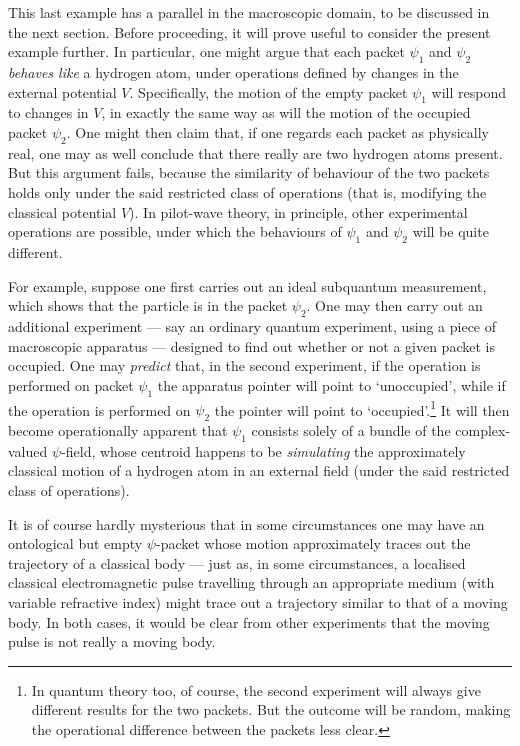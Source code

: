 \documentclass[12pt]{article}%
\begin{document}
This last example has a parallel in the macroscopic domain, to be discussed in
the next section. Before proceeding, it will prove useful to consider the
present example further. In particular, one might argue that each packet
$\psi_{1}$ and $\psi_{2}$ \textit{behaves like} a hydrogen atom, under
operations defined by changes in the external potential $V$. Specifically, the
motion of the empty packet $\psi_{1}$ will respond to changes in $V$, in
exactly the same way as will the motion of the occupied packet $\psi_{2}$. One
might then claim that, if one regards each packet as physically real, one may
as well conclude that there really are two hydrogen atoms present. But this
argument fails, because the similarity of behaviour of the two packets holds
only under the said restricted class of operations (that is, modifying the
classical potential $V$). In pilot-wave theory, in principle, other
experimental operations are possible, under which the behaviours of $\psi_{1}$
and $\psi_{2}$ will be quite different.

For example, suppose one first carries out an ideal subquantum measurement,
which shows that the particle is in the packet $\psi_{2}$. One may then carry
out an additional experiment --- say an ordinary quantum experiment, using a
piece of macroscopic apparatus --- designed to find out whether or not a given
packet is occupied. One may \textit{predict} that, in the second experiment,
if the operation is performed on packet $\psi_{1}$ the apparatus pointer will
point to `unoccupied', while if the operation is performed on $\psi_{2}$ the
pointer will point to `occupied'.\footnote{In quantum theory too, of course,
the second experiment will always give different results for the two packets.
But the outcome will be random, making the operational difference between the
packets less clear.} It will then become operationally apparent that $\psi
_{1}$ consists solely of a bundle of the complex-valued $\psi$-field, whose
centroid happens to be \textit{simulating} the approximately classical motion
of a hydrogen atom in an external field (under the said restricted class of operations).

It is of course hardly mysterious that in some circumstances one may have an
ontological but empty $\psi$-packet whose motion approximately traces out the
trajectory of a classical body --- just as, in some circumstances, a localised
classical electromagnetic pulse travelling through an appropriate medium (with
variable refractive index) might trace out a trajectory similar to that of a
moving body. In both cases, it would be clear from other experiments that the
moving pulse is not really a moving body.
\end{document}
